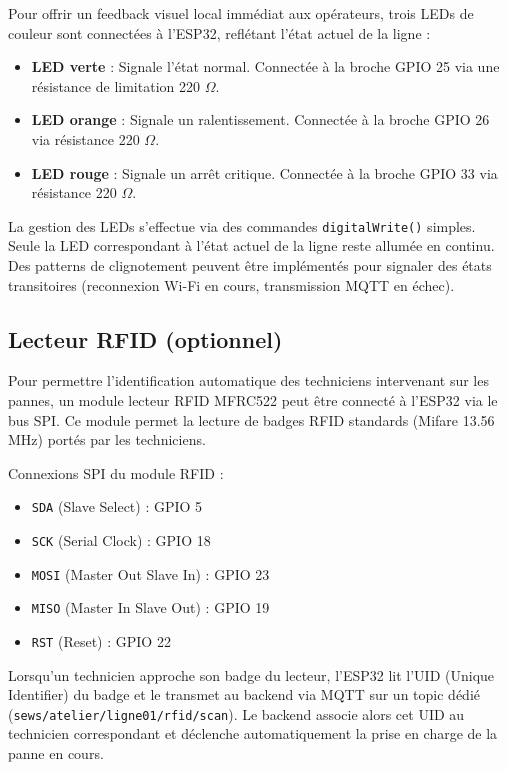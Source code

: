Pour offrir un feedback visuel local immédiat aux opérateurs, trois LEDs de couleur sont connectées à l'ESP32, reflétant l'état actuel de la ligne :

\begin{itemize}
    \item \textbf{LED verte} : Signale l'état normal. Connectée à la broche GPIO 25 via une résistance de limitation 220 $\Omega$.
    
    \item \textbf{LED orange} : Signale un ralentissement. Connectée à la broche GPIO 26 via résistance 220 $\Omega$.
    
    \item \textbf{LED rouge} : Signale un arrêt critique. Connectée à la broche GPIO 33 via résistance 220 $\Omega$.
\end{itemize}

La gestion des LEDs s'effectue via des commandes \texttt{digitalWrite()} simples. Seule la LED correspondant à l'état actuel de la ligne reste allumée en continu. Des patterns de clignotement peuvent être implémentés pour signaler des états transitoires (reconnexion Wi-Fi en cours, transmission MQTT en échec).

\subsection{Lecteur RFID (optionnel)}

Pour permettre l'identification automatique des techniciens intervenant sur les pannes, un module lecteur RFID MFRC522 peut être connecté à l'ESP32 via le bus SPI. Ce module permet la lecture de badges RFID standards (Mifare 13.56 MHz) portés par les techniciens.

Connexions SPI du module RFID :
\begin{itemize}
    \item \texttt{SDA} (Slave Select) : GPIO 5
    \item \texttt{SCK} (Serial Clock) : GPIO 18
    \item \texttt{MOSI} (Master Out Slave In) : GPIO 23
    \item \texttt{MISO} (Master In Slave Out) : GPIO 19
    \item \texttt{RST} (Reset) : GPIO 22
\end{itemize}

Lorsqu'un technicien approche son badge du lecteur, l'ESP32 lit l'UID (Unique Identifier) du badge et le transmet au backend via MQTT sur un topic dédié (\texttt{sews/atelier/ligne01/rfid/scan}). Le backend associe alors cet UID au technicien correspondant et déclenche automatiquement la prise en charge de la panne en cours.

